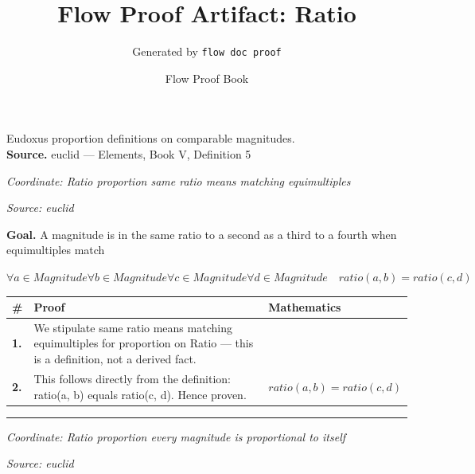 \documentclass[11pt]{article}
\title{Flow Proof Artifact: Ratio}
\author{Generated by \texttt{flow doc proof}}
\date{Flow Proof Book}
\theoremstyle{definition}
\begin{document}
\maketitle
Eudoxus proportion definitions on comparable magnitudes.\\[0.5em]
\textbf{Source.} euclid — Elements, Book V, Definition 5\\[0.5em]
\bigskip
{}\par
\smallskip\noindent\textit{Coordinate: Ratio \cdot proportion \cdot same ratio means matching equimultiples}\par
\smallskip\noindent\textit{Source: euclid}\par
\medskip
\noindent\textbf{Goal.} A magnitude is in the same ratio to a second as a third to a fourth when equimultiples match\par
\noindent$\displaystyle \forall a \in Magnitude \forall b \in Magnitude \forall c \in Magnitude \forall d \in Magnitude\quad ratio(a, b) = ratio(c, d)$\par
\medskip
\noindent
\begin{tabular}{@{} >{\raggedright\arraybackslash}p{} >{\raggedright\arraybackslash}p{} >{\raggedleft\arraybackslash}p{} @{}}
\textbf{\#} & \textbf{Proof} & \textbf{Mathematics} \\
\midrule
\textbf{1.} & We stipulate same ratio means matching equimultiples for proportion on Ratio — this is a definition, not a derived fact. & \\[0.45em]
\textbf{2.} & This follows directly from the definition: ratio(a, b) equals ratio(c, d). Hence proven. & $\displaystyle ratio(a, b) = ratio(c, d)$ \\[0.45em]
\bottomrule
\end{tabular}
\label{thm:Ratio-proportion-same_ratio_means_matching_equimultiples}
\par\medskip\hrule
\bigskip
{}\par
\smallskip\noindent\textit{Coordinate: Ratio \cdot proportion \cdot every magnitude is proportional to itself}\par
\smallskip\noindent\textit{Source: euclid}\par
\end{document}
